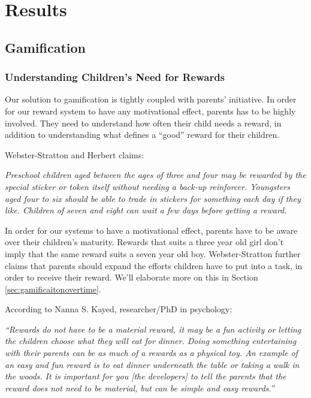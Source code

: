 \chapter{Results}
\label{chp:results}

\section{Gamification}
\label{sec:gamificationresults}

\subsection{Understanding Children's Need for Rewards}

Our solution to gamification is tightly coupled with parents' initiative. In order for our reward system to have any motivational effect, parents has to be highly involved. They need to understand how often their child needs a reward, in addition to understanding what defines a ``good'' reward for their children. 

Webster-Stratton and Herbert claims:

\textit{Preschool children aged between the ages of three and four may be rewarded by the special sticker or token itself without needing a back-up reinforcer. Youngsters aged four to six should be able to trade in stickers for something each day if they like. Children of seven and eight can wait a few days before getting a reward. } \cite{webster1994troubled}

In order for our systems to have a motivational effect, parents have to be aware over their children's maturity. Rewards that suits a three year old girl don't imply that the same reward suits a seven year old boy. Webster-Stratton further claims that parents should expand the efforts children have to put into a task, in order to receive their reward. We'll elaborate more on this in Section \ref{sec:gamificaitonovertime}.  

According to Nanna S. Kayed, researcher/PhD in psychology: 

\textit{``Rewards do not have to be a material reward, it may be a fun activity or letting the children choose what they will eat for dinner. Doing something entertaining with their parents can be as much of a rewards as a physical toy. An example of an easy and fun reward is to eat dinner underneath the table or taking a walk in the woods. It is important for you [the developers] to tell the parents that the reward does not need to be material, but can be simple and easy rewards.''}


